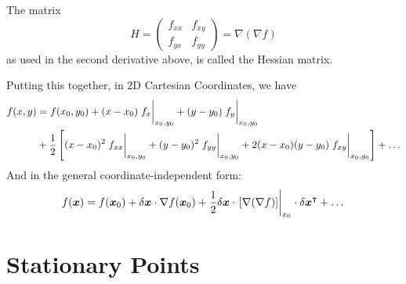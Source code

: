 \documentclass{article}
\begin{document}
	The matrix
	\[ H = \begin{pmatrix}
		f_{xx} & f_{xy} \\
		f_{yx} & f_{yy}
	\end{pmatrix} = \nabla(\nabla f) \]
	as used in the second derivative above, is called the Hessian matrix.

	Putting this together, in 2D Cartesian Coordinates, we have
	\begin{align*}
		f(x, y) &= f(x_0, y_0) + (x-x_0)\eval{f_x}_{x_0, y_0} + (y-y_0)\eval{f_y}_{x_0, y_0} \\&+ \frac{1}{2}\left[ (x-x_0)^2\eval{f_{xx}}_{x_0, y_0} + (y-y_0)^2\eval{f_{yy}}_{x_0, y_0} + 2(x-x_0)(y-y_0)\eval{f_{xy}}_{x_0, y_0} \right] + \dots
	\end{align*}
	And in the general coordinate-independent form:
	\[ f(\bm x) = f(\bm x_0) + \delta \bm x \cdot \nabla f(\bm x_0) + \frac{1}{2}\delta \bm x \cdot \eval{[\nabla (\nabla f)]}_{x_0} \cdot \delta \bm x^\transpose + \dots \]

	\section{Stationary Points}
\end{document}
